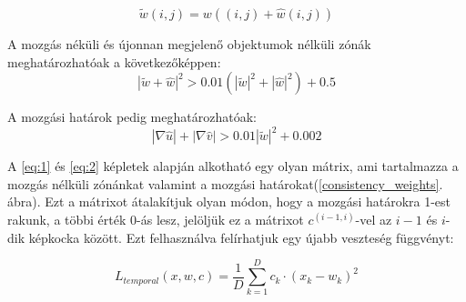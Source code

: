 \documentclass[12pt, a4paper, oneside]{book}
\theoremstyle{tetel}
\begin{document}
\begin{equation}
\tilde{w}(i, j) = w((i, j) + \hat{w}(i, j))
\end{equation}

A mozgás néküli és újonnan megjelenő objektumok nélküli zónák meghatározhatóak a következőképpen:
\begin{equation} \label{eq:1}
|\tilde{w} + \hat{w}|^2 > 0.01(|\tilde{w}|^2 + |\hat{w}|^2) + 0.5
\end{equation}

A mozgási határok pedig meghatározhatóak:
\begin{equation} \label{eq:2}
|\nabla\hat{u}| + |\nabla\hat{v}| > 0.01|\tilde{w}|^2 + 0.002
\end{equation}

A \ref{eq:1} és \ref{eq:2} képletek alapján alkotható egy olyan mátrix, ami tartalmazza a mozgás nélküli zónánkat valamint a mozgási határokat(\ref{consistency_weights}. ábra). Ezt a mátrixot átalakítjuk olyan módon, hogy a mozgási határokra 1-est rakunk, a többi érték 0-ás lesz, jelöljük ez a mátrixot \(c^{(i-1,i)}\)-vel az \(i-1\) és \(i\)-dik képkocka között. Ezt felhasználva felírhatjuk egy újabb veszteség függvényt: 

\begin{equation} \label{eq:2}
L_{temporal}(x, w, c) = \frac{1}{D}\sum_{k=1}^{D}c_k\cdot(x_k-w_k)^2
\end{equation}
\end{document}
